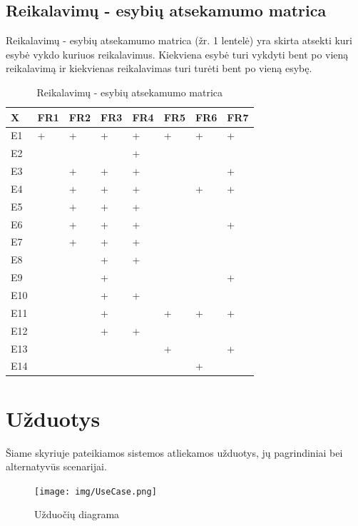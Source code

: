 \documentclass{VUMIFPSkursinis}
\begin{document}
	\subsection{Reikalavimų - esybių atsekamumo matrica}\label{strukturinisDSModelis_matrica}
		Reikalavimų - esybių atsekamumo matrica (žr. 1 lentelė) yra skirta atsekti kuri esybė vykdo kuriuos reikalavimus.
		Kiekviena esybė turi vykdyti bent po vieną reikalavimą ir kiekvienas reikalavimas turi turėti bent po vieną esybę.
			\begin{table}[H]\footnotesize
  \centering
  \caption{Reikalavimų - esybių atsekamumo matrica}
  \resizebox{\textwidth}{!}
  {\begin{tabular}{|l| l| l| l| l| l| l| l|} \hline
    	X		& FR1		& FR2		& FR3		& FR4		& FR5		& FR6		& FR7\\
\hline
	E1		&+		&+		&+		&+		&+		&+		&+\\
\hline
	E2		&		&		&		&+		&		&		&\\
\hline
	E3		&		&+		&+		&+		&		&		&+\\
\hline
	E4		&		&+		&+		&+		&		&+		&+\\
\hline
	E5		&		&+		&+		&+		&		&		&\\
\hline
	E6		&		&+		&+		&+		&		&		&+\\
\hline
	E7		&		&+		&+		&+		&		&		&\\
\hline
	E8		&		&		&+		&+		&		&		&\\
\hline
	E9		&		&		&+		&		&		&		&+\\
\hline
	E10		&		&		&+		&+		&		&		&\\
\hline
	E11		&		&		&+		&		&+		&+		&+\\
\hline
	E12		&		&		&+		&+		&		&		&\\
\hline
	E13		&		&		&		&		&+		&		&+\\
\hline
	E14		&		&		&		&		&		&+		&\\
\hline
  \end{tabular}}
  \label{tab:table example}
\end{table}

\section{Užduotys}
	Šiame skyriuje pateikiamos sistemos atliekamos užduotys, jų pagrindiniai bei alternatyvūs scenarijai.
	\begin{figure}[H]
		\centering
		\texttt{[image: img/UseCase.png]}
		\caption{Užduočių diagrama}
		\label{img:psi2-use-case}
	\end{figure}
\end{document}
